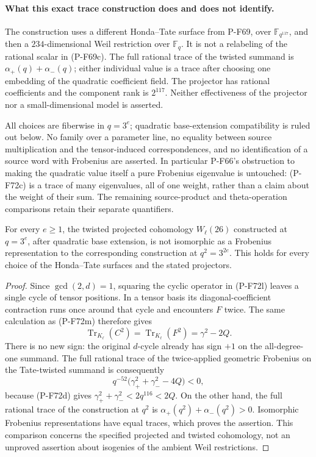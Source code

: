 \paragraph{What this exact trace construction does and does not identify.}
The construction uses a different Honda--Tate surface
from P-F69, over $\mathbb F_{q^{117}}$, and then a
$234$-dimensional Weil restriction over $\mathbb F_q$.
It is not a relabeling of the rational scalar in
(P-F69c).  The full rational trace of the twisted
summand is $\alpha_+(q)+\alpha_-(q)$; either individual
value is a trace after choosing one embedding of the
quadratic coefficient field.  The projector has
rational coefficients and the component rank is
$2^{117}$.  Neither effectiveness of the projector
nor a small-dimensional model is asserted.

All choices are fiberwise in $q=3^e$; quadratic
base-extension compatibility is ruled out below.
No family over a parameter line,
no equality between source multiplication and the
tensor-induced correspondences, and no identification
of a source word with Frobenius are asserted.
In particular P-F66's obstruction to making the
quadratic value itself a pure Frobenius eigenvalue
is untouched: (P-F72c) is a trace of many eigenvalues,
all of one weight, rather than a claim about the
weight of their sum.  The remaining source-product
and theta-operation comparisons retain their separate
quantifiers.

\begin{corollary}
For every $e\ge1$, the twisted projected cohomology
$W_\ell(26)$ constructed at $q=3^e$, after quadratic
base extension, is not isomorphic as a Frobenius
representation to the corresponding construction at
$q^2=3^{2e}$.  This holds for every choice of the
Honda--Tate surfaces and the stated projectors.
\end{corollary}

\begin{proof}
Since $\gcd(2,d)=1$, squaring the cyclic operator
in (P-F72l) leaves a single cycle of tensor positions.
In a tensor basis its diagonal-coefficient contraction
runs once around that cycle and encounters $F$ twice.
The same calculation as (P-F72m) therefore gives
\[
            \operatorname{Tr}_{K_\ell}(C^2)
                   =\operatorname{Tr}_{K_\ell}(F^2)
                   =\gamma^2-2Q.                             \tag{P-F72n}
\]
There is no new sign: the original $d$-cycle already
has sign $+1$ on the all-degree-one summand.
The full rational trace of the twice-applied geometric
Frobenius on the Tate-twisted summand is consequently
\[
       q^{-52}\bigl(\gamma_+^2+\gamma_-^2-4Q\bigr)<0,          \tag{P-F72o}
\]
because (P-F72d) gives
$\gamma_+^2+\gamma_-^2<2q^{116}<2Q$.
On the other hand, the full rational trace of the
construction at $q^2$ is
$\alpha_+(q^2)+\alpha_-(q^2)>0$.
Isomorphic Frobenius representations have equal traces,
which proves the assertion.  This comparison concerns
the specified projected and twisted cohomology, not an
unproved assertion about isogenies of the ambient
Weil restrictions.
\end{proof}
